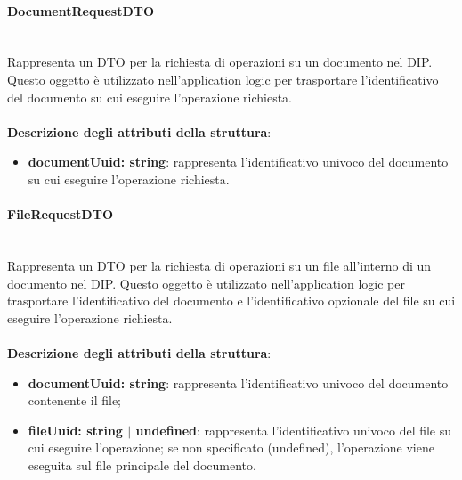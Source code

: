 \documentclass[a4paper,12pt]{article}
\begin{document}
{{{                \paragraph{DocumentRequestDTO}\label{par:DocumentRequestDTO}\mbox{}\\
                Rappresenta un DTO per la richiesta di operazioni su un documento nel DIP. Questo oggetto è utilizzato nell'application logic per trasportare l'identificativo del documento su cui eseguire l'operazione richiesta.\\
                \\
                \textbf{Descrizione degli attributi della struttura}:
                \begin{itemize}
                    \item \textbf{documentUuid: string}: rappresenta l'identificativo univoco del documento su cui eseguire l'operazione richiesta.
                \end{itemize}

                \paragraph{FileRequestDTO}\label{par:FileRequestDTO}\mbox{}\\
                Rappresenta un DTO per la richiesta di operazioni su un file all'interno di un documento nel DIP. Questo oggetto è utilizzato nell'application logic per trasportare l'identificativo del documento e l'identificativo opzionale del file su cui eseguire l'operazione richiesta.\\
                \\
                \textbf{Descrizione degli attributi della struttura}:
                \begin{itemize}
                    \item \textbf{documentUuid: string}: rappresenta l'identificativo univoco del documento contenente il file;
                    \item \textbf{fileUuid: string $|$ undefined}: rappresenta l'identificativo univoco del file su cui eseguire l'operazione; se non specificato (undefined), l'operazione viene eseguita sul file principale del documento.
                \end{itemize}
}}}
\end{document}
